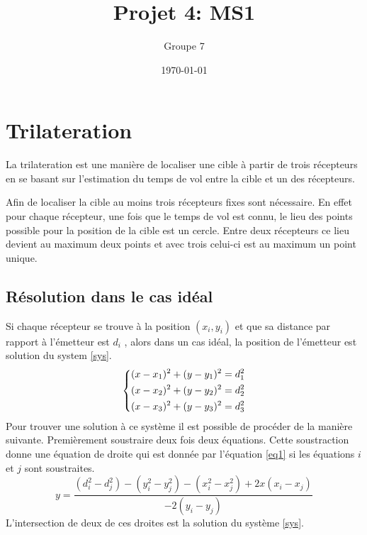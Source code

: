 \documentclass[10pt,a4paper]{article}
\begin{document}
\title{Projet 4: MS1}
\date\today
\author{Groupe 7}
\maketitle
\section{Trilateration}
La trilateration est une manière de localiser une cible à partir de trois récepteurs en se basant sur l'estimation du temps de vol entre la cible et un des récepteurs.

Afin de localiser la cible au moins trois récepteurs fixes sont nécessaire. En effet pour chaque récepteur, une fois que le temps de vol est connu, le lieu des points possible pour la position de la cible est un cercle. Entre deux récepteurs ce lieu devient au maximum deux points et avec trois celui-ci est au maximum un point unique. 
\subsection{Résolution dans le cas idéal}
Si chaque récepteur se trouve à la position $(x_i , y_i)$ et que sa distance par rapport à l'émetteur est $d_i$ , alors dans un cas idéal, la position de l'émetteur est solution du system \ref{sys}. 
\begin{equation}
\begin{dcases}
(x - x_1)^2 + (y-y_1)^2 = d_1^2 \\
(x - x_2)^2 + (y-y_2)^2 = d_2^2 \\
(x - x_3)^2 + (y-y_3)^2 = d_3^2 
\end{dcases}
\label{sys}
\end{equation}
Pour trouver une solution à ce système il est possible de procéder de la manière suivante. Premièrement soustraire deux fois deux équations. Cette soustraction donne une équation de droite qui est donnée par l'équation \ref{eq1} si les équations $i$ et $j$ sont soustraites.
\begin{equation}
\label{eq1}
y = \frac{(d_i^2 - d_j^2) - (y_i^2 -y_j^2)-(x_i^2 - x_j^2) + 2x(x_i-x_j)}{-2(y_i-y_j)}
\end{equation}
L'intersection de deux de ces droites est la solution du système \ref{sys}.
\end{document}
